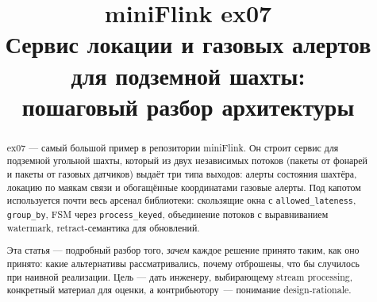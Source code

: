\documentclass[11pt,a4paper]{article}
\title{\textbf{miniFlink ex07}\\[4pt]
  \large Сервис локации и газовых алертов для подземной шахты:\\
  пошаговый разбор архитектуры}
\author{}
\date{}
\begin{document}
\maketitle

\begin{abstract}
\noindent
ex07 --- самый большой пример в репозитории miniFlink. Он строит сервис
для подземной угольной шахты, который из двух независимых потоков
(пакеты от фонарей и пакеты от газовых датчиков) выдаёт три типа
выходов: алерты состояния шахтёра, локацию по маякам связи и
обогащённые координатами газовые алерты. Под капотом используется
почти весь арсенал библиотеки: скользящие окна с
\texttt{allowed\_lateness}, \texttt{group\_by}, FSM через
\texttt{process\_keyed}, объединение потоков с выравниванием
watermark, retract-семантика для обновлений.

Эта статья --- подробный разбор того, \textit{зачем} каждое решение
принято таким, как оно принято: какие альтернативы рассматривались,
почему отброшены, что бы случилось при наивной реализации. Цель ---
дать инженеру, выбирающему stream processing, конкретный материал для
оценки, а контрибьютору~--- понимание design-rationale.
\end{abstract}

\tableofcontents
\bigskip







\end{document}
